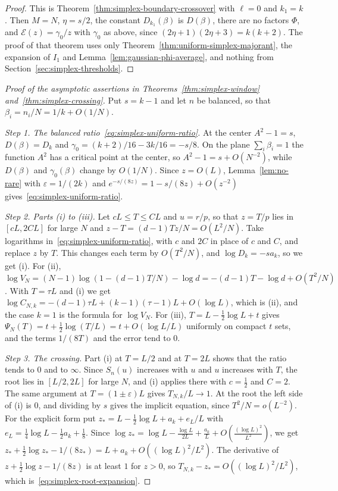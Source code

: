 \begin{proof}
This is Theorem~\ref{thm:simplex-boundary-crossover} with $\ell=0$ and $k_1=k$.
Then $M=N$, $\eta=s/2$, the constant $D_{k_1}(\beta)$ is $D(\beta)$, there are
no factors $\Phi$, and $\mathcal E(z)=\gamma_0/z$ with $\gamma_0$ as above,
since $(2\eta+1)(2\eta+3)=k(k+2)$. The proof of that theorem uses only
Theorem~\ref{thm:uniform-simplex-majorant}, the expansion of $I_1$ and
Lemma~\ref{lem:gaussian-phi-average}, and nothing from
Section~\ref{sec:simplex-thresholds}.
\end{proof}

\begin{proof}[Proof of the asymptotic assertions in
Theorems~\ref{thm:simplex-window} and~\ref{thm:simplex-crossing}]
Put $s=k-1$ and let $n$ be balanced, so that $\beta_i=n_i/N=1/k+O(1/N)$.

\emph{Step 1. The balanced ratio~\eqref{eq:simplex-uniform-ratio}.} At the
center $A^2-1=s$, $D(\beta)=D_k$ and $\gamma_0=(k+2)/16-3k/16=-s/8$. On the
plane $\sum_i\beta_i=1$ the function $A^2$ has a critical point at the center,
so $A^2-1=s+O(N^{-2})$, while $D(\beta)$ and $\gamma_0(\beta)$ change by
$O(1/N)$. Since $z=O(L)$, Lemma~\ref{lem:no-rare} with $\varepsilon=1/(2k)$ and
$e^{-s/(8z)}=1-s/(8z)+O(z^{-2})$ gives~\eqref{eq:simplex-uniform-ratio}.

\emph{Step 2. Parts (i) to (iii).} Let $cL\le T\le CL$ and $u=r/p$, so that
$z=T/p$ lies in $[cL,2CL]$ for large $N$ and $z-T=(d-1)Tz/N=O(L^2/N)$. Take
logarithms in~\eqref{eq:simplex-uniform-ratio}, with $c$ and $2C$ in place of $c$
and $C$, and replace $z$ by $T$. This changes each term by $O(T^2/N)$, and
$\log D_k=-sa_k$, so we get (i). For (ii),
$\log V_N=(N-1)\log(1-(d-1)T/N)-\log d=-(d-1)T-\log d+O(T^2/N)$. With $T=\tau L$
and (i) we get $\log C_{N,k}=-(d-1)\tau L+(k-1)(\tau-1)L+O(\log L)$, which is (ii),
and the case $k=1$ is the formula for $\log V_N$. For (iii),
$T=L-\frac12\log L+t$ gives $\Psi_N(T)=t+\frac12\log(T/L)=t+O(\log L/L)$
uniformly on compact $t$ sets, and the terms $1/(8T)$ and the error tend to $0$.

\emph{Step 3. The crossing.} Part (i) at $T=L/2$ and at $T=2L$ shows that the
ratio tends to $0$ and to $\infty$. Since $S_n(u)$ increases with $u$ and $u$
increases with $T$, the root lies in $[L/2,2L]$ for large $N$, and (i) applies
there with $c=\frac12$ and $C=2$. The same argument at $T=(1\pm\varepsilon)L$
gives $T_{N,k}/L\to1$. At the root the left side of (i) is $0$, and dividing by
$s$ gives the implicit equation, since $T^2/N=o(L^{-2})$. For the explicit form
put $z_*=L-\frac12\log L+a_k+e_L/L$ with $e_L=\frac14\log L-\frac12a_k+\frac18$.
Since $\log z_*=\log L-\frac{\log L}{2L}+\frac{a_k}L+O(\frac{(\log L)^2}{L^2})$,
we get $z_*+\frac12\log z_*-1/(8z_*)=L+a_k+O((\log L)^2/L^2)$. The derivative of
$z+\frac12\log z-1/(8z)$ is at least $1$ for $z>0$, so
$T_{N,k}-z_*=O((\log L)^2/L^2)$, which is~\eqref{eq:simplex-root-expansion}.


\end{proof}
